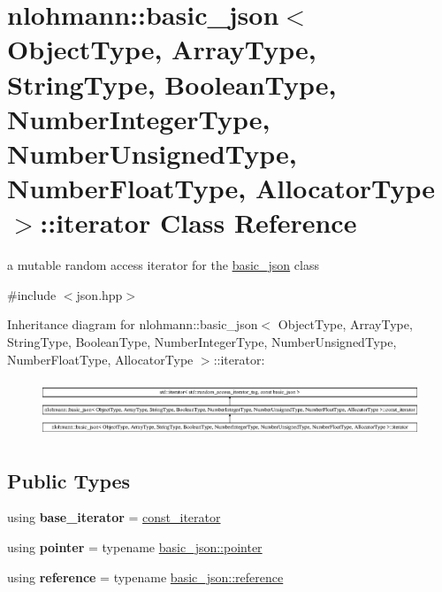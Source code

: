 \hypertarget{a00079}{}\section{nlohmann\+:\+:basic\+\_\+json$<$ Object\+Type, Array\+Type, String\+Type, Boolean\+Type, Number\+Integer\+Type, Number\+Unsigned\+Type, Number\+Float\+Type, Allocator\+Type $>$\+:\+:iterator Class Reference}
\label{a00079}


a mutable random access iterator for the \hyperlink{a00025}{basic\+\_\+json} class  




{\ttfamily \#include $<$json.\+hpp$>$}

Inheritance diagram for nlohmann\+:\+:basic\+\_\+json$<$ Object\+Type, Array\+Type, String\+Type, Boolean\+Type, Number\+Integer\+Type, Number\+Unsigned\+Type, Number\+Float\+Type, Allocator\+Type $>$\+:\+:iterator\+:\begin{figure}[H]
\begin{center}
\leavevmode
\includegraphics[height=1.705584cm]{a00079}
\end{center}
\end{figure}
\subsection*{Public Types}
\begin{DoxyCompactItemize}
\item 
using {\bfseries base\+\_\+iterator} = \hyperlink{a00038}{const\+\_\+iterator}\hypertarget{a00079_ac48754e4dc48d65d95294bd170dcd857}{}\label{a00079_ac48754e4dc48d65d95294bd170dcd857}

\item 
using {\bfseries pointer} = typename \hyperlink{a00025_a9d1b58099dc64695fcf2847ab0b2a7c7}{basic\+\_\+json\+::pointer}\hypertarget{a00079_a3aae1df93a78b201d98e178c1c7d02a7}{}\label{a00079_a3aae1df93a78b201d98e178c1c7d02a7}

\item 
using {\bfseries reference} = typename \hyperlink{a00025_a3ec8e17be8732fe436e9d6733f52b7a3}{basic\+\_\+json\+::reference}\hypertarget{a00079_a97aff5d71246774267a81066460dd1cf}{}\label{a00079_a97aff5d71246774267a81066460dd1cf}

\end{DoxyCompactItemize}
